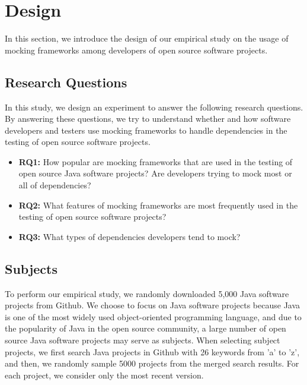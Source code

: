\section{Design}
\label{sec:designmock}
In this section, we introduce the design of our empirical study on the usage of mocking frameworks among developers of open source software projects. 
\vspace{-0.2cm}

\subsection{Research Questions}
\label{subsec:rq}
\vspace{-0.2cm}

In this study, we design an experiment to answer the following research questions. By answering these questions, we try to understand whether and how software developers and testers use mocking frameworks to handle dependencies in the testing of open source software projects. 
\begin{itemize}
\item \textbf{RQ1:} How popular are mocking frameworks that are used in the testing of open source Java software projects? Are developers trying to mock most or all of dependencies?
\item \textbf{RQ2:} What features of mocking frameworks are most frequently used in the testing of open source software projects?
\item \textbf{RQ3:} What types of dependencies developers tend to mock?
\end{itemize}
\vspace{-0.2cm}

\subsection{Subjects}
\vspace{-0.2cm}

To perform our empirical study, we randomly downloaded 5,000 Java software projects from Github. We choose to focus on Java software projects because Java is one of the most widely used object-oriented programming language, and due to the popularity of Java in the open source community, a large number of open source Java software projects may serve as subjects. When selecting subject projects, we first search Java projects in Github with 26 keywords from 'a' to 'z', and then, we randomly sample 5000 projects from the merged search results. For each project, we consider only the most recent version. 


